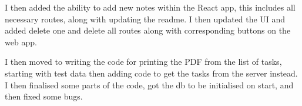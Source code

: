\documentclass[12pt]{extarticle}
\begin{document}
I then added the ability to add new notes within the React app, this includes all necessary routes, along with updating the readme. I then updated the UI and added delete one and delete all routes along with corresponding buttons on the web app. 

I then moved to writing the code for printing the PDF from the list of tasks, starting with test data then adding code to get the tasks from the server instead. I then finalised some parts of the code, got the db to be initialised on start, and then fixed some bugs.
\end{document}
